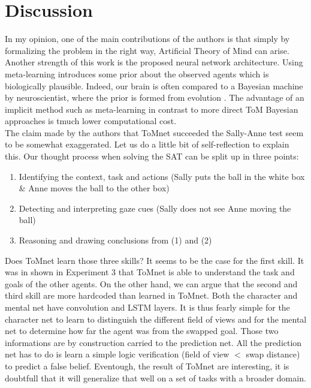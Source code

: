 \documentclass[twocolumn,superscriptaddress,aps]{revtex4-1}
\begin{document}
\section{Discussion}

\noindent In my opinion, one of the main contributions of the authors is that simply by formalizing the problem in the right way, Artificial Theory of Mind can arise. Another strength of this work is the proposed neural network architecture. Using meta-learning introduces some prior about the observed agents which is biologically plausible. Indeed, our brain is often compared to a Bayesian machine by neuroscientist, where the prior is formed from evolution \cite{bayesian-brain}. The advantage of an implicit method such as meta-learning in contrast to more direct ToM Bayesian approaches \cite{dragan, nature} is tmuch lower computational cost.\\

\indent The claim made by the authors that ToMnet succeeded the Sally-Anne test seem to be somewhat exaggerated. Let us do a little bit of self-reflection to explain this. Our thought process when solving the SAT can be split up in three points:
\begin{enumerate}[label=(\arabic*)]
\item Identifying the context, task and actions (Sally puts the ball in the white box \& Anne moves the ball to the other box)
\item Detecting and interpreting gaze cues (Sally does not see Anne moving the ball)
\item Reasoning and drawing conclusions from (1) and (2)
\end{enumerate}
Does ToMnet learn those three skills? It seems to be the case for the first skill. It was in shown in Experiment 3 that ToMnet is able to understand the task and goals of the other agents. On the other hand, we can argue that the second and third skill are more hardcoded than learned in ToMnet. Both the character and mental net have convolution and LSTM layers. It is thus fearly simple for the character net to learn to distinguish the different field of views and for the mental net to determine how far the agent was from the swapped goal. Those two informations are by construction carried to the prediction net. All the prediction net has to do is learn a simple logic verification (field of view $<$ swap distance) to predict a false belief. Eventough, the result of ToMnet are interesting, it is doubtfull that it will generalize that well on a set of tasks with a broader domain.\\
\end{document}
